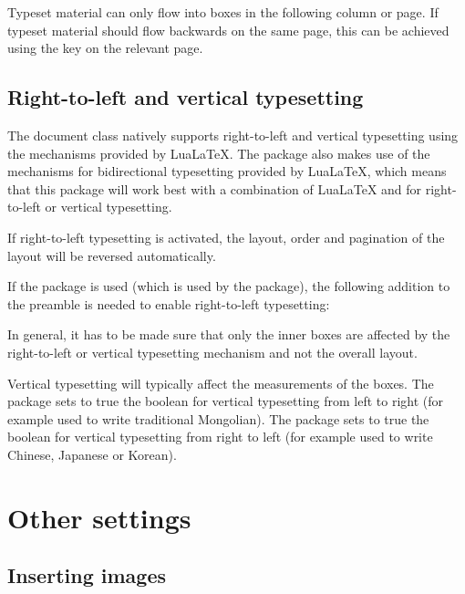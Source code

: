 \documentclass[a4paper]{article}
\begin{document}
Typeset material can only flow into boxes in the following column or page. If typeset material should flow backwards on the same page, this can be achieved using the key  on the relevant page.

\subsection{Right-to-left and vertical typesetting}

The document class natively supports right-to-left and vertical typesetting using the mechanisms provided by LuaLaTeX. The  package also makes use of the mechanisms for bidirectional typesetting provided by LuaLaTeX, which means that this package will work best with a combination of LuaLaTeX and  for right-to-left or vertical typesetting.

If right-to-left typesetting is activated, the layout, order and pagination of the layout will be reversed automatically.

If the  package is used (which is used by the  package), the following addition to the preamble is needed to enable right-to-left typesetting:

\begin{codeexample}
\end{codeexample}

In general, it has to be made sure that only the inner boxes are affected by the right-to-left or vertical typesetting mechanism and not the overall layout.

Vertical typesetting will typically affect the measurements of the boxes. The package sets to true the boolean  for vertical typesetting from left to right (for example used to write traditional Mongolian). The package sets to true the boolean  for vertical typesetting from right to left (for example used to write Chinese, Japanese or Korean).

\section{Other settings}

\subsection{Inserting images}
\end{document}
